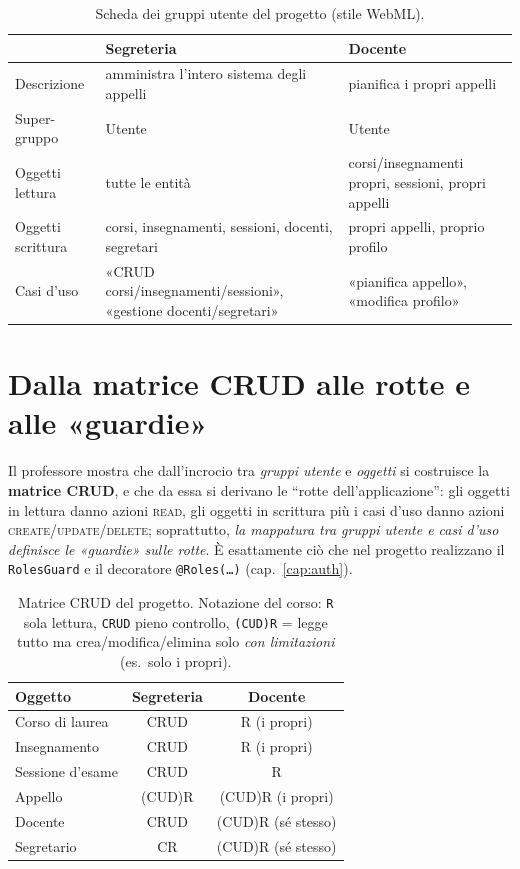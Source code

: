 \documentclass[11pt,a4paper,oneside]{report}
\newcommand{\code}[1]{\texttt{\small #1}}
\begin{document}
\begin{table}[h]
\centering
\small
\renewcommand{\arraystretch}{1.25}
\begin{tabularx}{\linewidth}{@{}lXX@{}}
\toprule
 & \textbf{Segreteria} & \textbf{Docente} \\
\midrule
Descrizione      & amministra l'intero sistema degli appelli & pianifica i propri appelli \\
Super-gruppo     & Utente & Utente \\
Oggetti lettura  & tutte le entità & corsi/insegnamenti propri, sessioni, propri appelli \\
Oggetti scrittura& corsi, insegnamenti, sessioni, docenti, segretari & propri appelli, proprio profilo \\
Casi d'uso       & «CRUD corsi/insegnamenti/sessioni», «gestione docenti/segretari» & «pianifica appello», «modifica profilo» \\
\bottomrule
\end{tabularx}
\caption{Scheda dei gruppi utente del progetto (stile WebML).}
\end{table}

\section{Dalla matrice CRUD alle rotte e alle «guardie»}
\label{sec:webml-crud}
Il professore mostra che dall'incrocio tra \emph{gruppi utente} e \emph{oggetti}
si costruisce la \textbf{matrice CRUD}, e che da essa si derivano le ``rotte
dell'applicazione'': gli oggetti in lettura danno azioni \textsc{read}, gli
oggetti in scrittura più i casi d'uso danno azioni \textsc{create/update/delete};
soprattutto, \emph{la mappatura tra gruppi utente e casi d'uso definisce le
«guardie» sulle rotte}. È esattamente ciò che nel progetto realizzano il
\code{RolesGuard} e il decoratore \code{@Roles(\ldots)} (cap.~\ref{cap:auth}).

\begin{table}[h]
\centering
\small
\renewcommand{\arraystretch}{1.25}
\begin{tabular}{@{}lcc@{}}
\toprule
\textbf{Oggetto} & \textbf{Segreteria} & \textbf{Docente} \\
\midrule
Corso di laurea & CRUD       & R (i propri) \\
Insegnamento    & CRUD       & R (i propri) \\
Sessione d'esame& CRUD       & R \\
Appello         & (CUD)R     & (CUD)R (i propri) \\
Docente         & CRUD       & (CUD)R (sé stesso) \\
Segretario      & CR         & (CUD)R (sé stesso) \\
\bottomrule
\end{tabular}
\caption{Matrice CRUD del progetto. Notazione del corso: \code{R} sola lettura,
\code{CRUD} pieno controllo, \code{(CUD)R} = legge tutto ma crea/modifica/elimina
solo \emph{con limitazioni} (es.\ solo i propri).}
\label{tab:crud}
\end{table}
\end{document}
